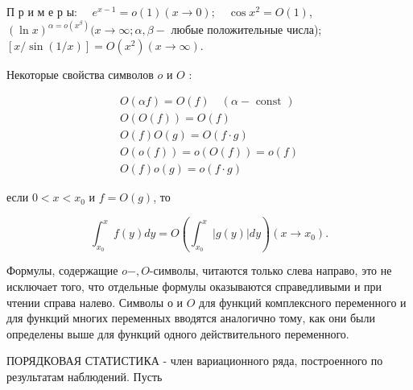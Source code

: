 \documentclass[10pt]{article}
\begin{document}
П р и м е р ы: $\quad e^{x-1}=o(1)(x \rightarrow 0) ; \quad \cos x^{2}=O(1)$, $(\ln x)^{\alpha=o\left(x^{\beta}\right)}(x \rightarrow \infty ; \alpha, \beta-$ любые положительные числа); $[x / \sin (1 / x)]=O\left(x^{2}\right)(x \rightarrow \infty)$.



Некоторые свойства символов $o$ и $O$ :



\[

\begin{gathered}

O(\alpha f)=O(f) \quad(\alpha-\text { const }) \\

O(O(f))=O(f) \\

O(f) O(g)=O(f \cdot g) \\

O(o(f))=o(O(f))=o(f) \\

O(f) o(g)=o(f \cdot g)

\end{gathered}

\]



если $0<x<x_{0}$ и $f=O(g)$, то



\[

\int_{x_{0}}^{x} f(y) d y=O\left(\int_{x_{0}}^{x}|g(y)| d y\right)\left(x \longrightarrow x_{0}\right) .

\]



Формулы, содержащие $o-, O$-символы, читаются только слева направо, это не исключает того, что отдельные формулы оказываются справедливыми и при чтении справа налево. Символы о и $O$ для функций комплексного переменного и для функций многих переменных вводятся аналогично тому, как они были определены выше для функций одного действительного переменного.



ПОРЯДКОВАЯ СТАТИСТИКА - член вариационного ряда, построенного по результатам наблюдений. Пусть
\end{document}
